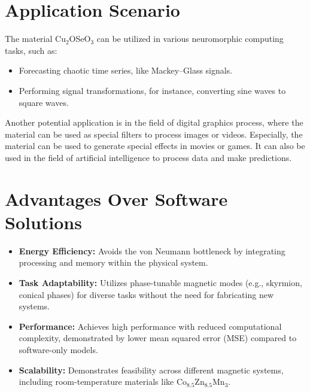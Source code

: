 \documentclass{article}
\begin{document}
\section*{Application Scenario}

The material Cu$_2$OSeO$_3$ can be utilized in various neuromorphic computing tasks, such as:
\begin{itemize}
  \item Forecasting chaotic time series, like Mackey–Glass signals.
  \item Performing signal transformations, for instance, converting sine waves to square waves.
\end{itemize}
Another potential application is in the field of digital graphics process, 
where the material can be used as special filters to process images or videos.
Especially, the material can be used to generate special effects in movies or games.
It can also be used in the field of artificial intelligence to process data and make predictions.

\section*{Advantages Over Software Solutions}

\begin{itemize}
  \item \textbf{Energy Efficiency:} Avoids the von Neumann bottleneck by integrating processing and memory within the physical system.
  \item \textbf{Task Adaptability:} Utilizes phase-tunable magnetic modes (e.g., skyrmion, conical phases) for diverse tasks without the need for fabricating new systems.
  \item \textbf{Performance:} Achieves high performance with reduced computational complexity, demonstrated by lower mean squared error (MSE) compared to software-only models.
  \item \textbf{Scalability:} Demonstrates feasibility across different magnetic systems, including room-temperature materials like Co$_8.5$Zn$_8.5$Mn$_3$.
\end{itemize}


\end{document}
